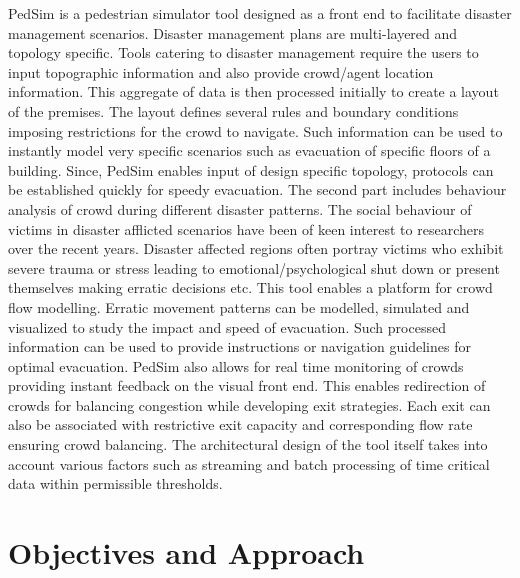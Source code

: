 PedSim is a pedestrian simulator tool designed as a front end to facilitate disaster management scenarios. Disaster management plans are multi-layered and topology specific. Tools catering to disaster management require the users to input topographic information and also provide crowd/agent location information. This aggregate of data is then processed initially to create a layout of the premises. The layout defines several rules and boundary conditions imposing restrictions for the crowd to navigate. Such information can be used to instantly model very specific scenarios such as evacuation of specific floors of a building. Since, PedSim enables input of design specific topology, protocols can be established quickly for speedy evacuation. The second part includes behaviour analysis of crowd during different disaster patterns. The social behaviour of victims in disaster afflicted scenarios have been of keen interest to researchers over the recent years. Disaster affected regions often portray victims who exhibit severe trauma or stress leading to emotional/psychological shut down or present themselves making erratic decisions etc. This tool enables a platform for crowd flow modelling. Erratic movement patterns can be modelled, simulated and visualized to study the impact and speed of evacuation. Such processed information can be used to provide instructions or navigation guidelines for optimal evacuation. PedSim also allows for real time monitoring of crowds providing instant feedback on the visual front end. This enables redirection of crowds for balancing congestion while developing exit strategies. Each exit can also be associated with restrictive exit capacity and corresponding flow rate ensuring crowd balancing.  The architectural design of the tool itself takes into account various factors such as streaming and batch processing of time critical data within permissible thresholds.

\section{Objectives and Approach}
\label{sec:intro:Objectives and Approach}

